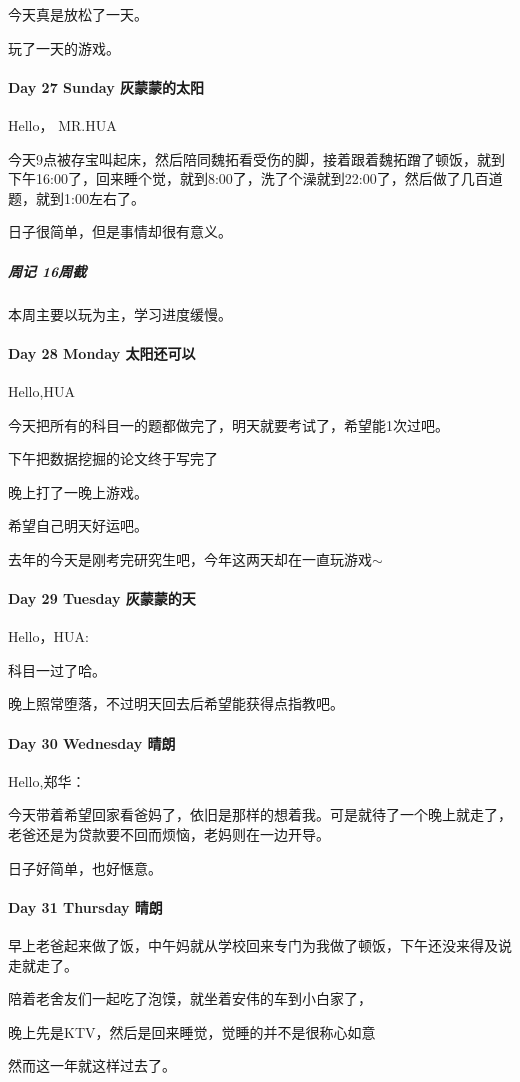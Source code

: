 \documentclass[UTF8,a4paper,8pt]{ctexart}
\begin{document}
         今天真是放松了一天。
         
         玩了一天的游戏。
         
         \paragraph{Day 27 Sunday \quad 灰蒙蒙的太阳}
         
         Hello， MR.HUA
         
         今天9点被存宝叫起床，然后陪同魏拓看受伤的脚，接着跟着魏拓蹭了顿饭，就到下午16:00了，回来睡个觉，就到8:00了，洗了个澡就到22:00了，然后做了几百道题，就到1:00左右了。
         
         日子很简单，但是事情却很有意义。
         
           \subparagraph{周记 \quad 16周截}
           
           本周主要以玩为主，学习进度缓慢。
           
        \paragraph{Day 28 Monday \quad 太阳还可以}
        Hello,HUA
        
        今天把所有的科目一的题都做完了，明天就要考试了，希望能1次过吧。
        
        下午把数据挖掘的论文终于写完了
        
        晚上打了一晚上游戏。
        
        希望自己明天好运吧。
        
        去年的今天是刚考完研究生吧，今年这两天却在一直玩游戏$\sim$
        
       \paragraph{Day 29 Tuesday  \quad  灰蒙蒙的天}
       
        Hello，HUA:
        
        科目一过了哈。
        
        晚上照常堕落，不过明天回去后希望能获得点指教吧。
        
      \paragraph{Day 30 Wednesday  \quad 晴朗}
      
      Hello,郑华：
      
      今天带着希望回家看爸妈了，依旧是那样的想着我。可是就待了一个晚上就走了，老爸还是为贷款要不回而烦恼，老妈则在一边开导。
      
      日子好简单，也好惬意。
      
      \paragraph{Day 31 Thursday \quad 晴朗}
      
      早上老爸起来做了饭，中午妈就从学校回来专门为我做了顿饭，下午还没来得及说走就走了。
      
      陪着老舍友们一起吃了泡馍，就坐着安伟的车到小白家了，
      
      晚上先是KTV，然后是回来睡觉，觉睡的并不是很称心如意
      
      然而这一年就这样过去了。
      
      
\end{document}
